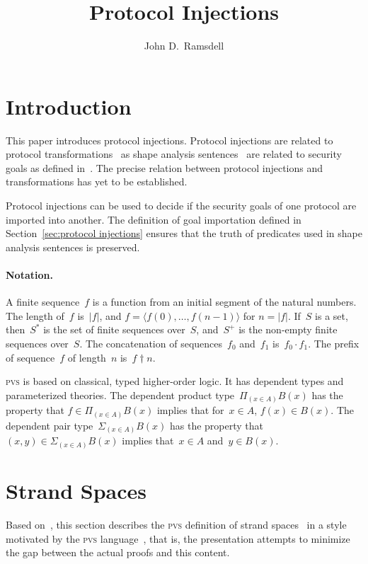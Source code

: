 \documentclass[12pt]{article}
\title{Protocol Injections}
\author{John D.\ Ramsdell}
\newcommand{\pvs}{\textsc{pvs}}
\newcommand{\seq}[1]{\ensuremath{\langle#1\rangle}}
\newcommand{\prefix}[2]{#1\dagger#2}
\newcommand{\append}{\cdot}
\newcommand{\dprod}[1]{\Pi_{(#1)}}
\newcommand{\dpair}[1]{\Sigma_{(#1)}}
\begin{document}
\maketitle

\section{Introduction}

This paper introduces protocol injections.  Protocol injections are
related to protocol transformations~\cite{Guttman12a} as shape
analysis sentences~\cite{Ramsdell12} are related to security goals as
defined in~\cite{Guttman12a}.  The precise relation between protocol
injections and transformations has yet to be established.

Protocol injections can be used to decide if the security goals of one
protocol are imported into another.  The definition of goal
importation defined in Section~\ref{sec:protocol injections} ensures
that the truth of predicates used in shape analysis sentences is
preserved.

\paragraph{Notation.}

A finite sequence~$f$ is a function from an initial segment of the
natural numbers.  The length of~$f$ is~$|f|$, and $f=\seq{f(0),\ldots,
  f(n-1)}$ for $n=|f|$.  If~$S$ is a set, then~$S^\ast$ is the set of
finite sequences over~$S$, and~$S^+$ is the non-empty finite sequences
over~$S$.  The concatenation of sequences~$f_0$ and~$f_1$
is~$f_0\append f_1$.  The prefix of sequence~$f$ of length~$n$
is~$\prefix{f}{n}$.

{\pvs} is based on classical, typed higher-order
logic.  It has dependent types and parameterized theories.
The dependent product type~$\dprod{x\in A}B(x)$ has the property that 
$f\in\dprod{x\in A}B(x)$ implies that for~$x\in A$, $f(x)\in B(x)$.
The dependent pair type~$\dpair{x\in A}B(x)$ has the property that 
$(x,y)\in\dpair{x\in A}B(x)$ implies that~$x\in A$ and~$y\in B(x)$.

\section{Strand Spaces}\label{sec:strand spaces}

Based on~\cite{cpsaspec09}, this section describes the {\pvs}
definition of strand spaces~\cite{ThayerHerzogGuttman99} in a style
motivated by the {\pvs} language~\cite{cade92-pvs}, that is, the
presentation attempts to minimize the gap between the actual proofs
and this content.
\end{document}
